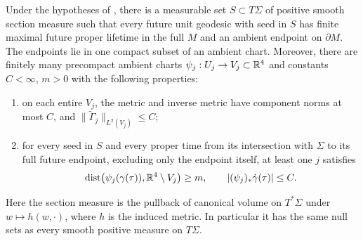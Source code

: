 \begin{proposition}
\label{prop:exit-family}
Under the hypotheses of , there is a measurable
set $S\subset T\Sigma$ of positive smooth section measure such
that every future unit geodesic with seed in $S$ has finite
maximal future proper lifetime in the full $M$ and an ambient
endpoint on $\partial M$.  The endpoints lie in one compact
subset of an ambient chart.  Moreover, there are finitely many
precompact ambient charts $\psi_j:U_j\to V_j\subset\mathbb R^4$ and
constants $C<\infty$, $m>0$ with the following properties:
\begin{enumerate}[label=(\roman*)]
\item on each entire $V_j$, the metric and inverse metric have
      component norms at most $C$, and
      $\|\widetilde\Gamma_j\|_{L^2(V_j)}\le C$;
\item for every seed in $S$ and every proper time from its
      intersection with $\Sigma$ to its full future endpoint,
      excluding only the endpoint itself, at least one $j$
      satisfies
      \begin{equation}\label{ex:chart-witness}
      \operatorname{dist}\bigl(\psi_j(\gamma(\tau)),
                                  \mathbb R^4\setminus V_j\bigr)\ge m,
      \qquad
      |(\psi_j)_*\dot\gamma(\tau)|\le C.
      \end{equation}
\end{enumerate}
Here the section measure is the pullback of canonical volume
on $T^*\Sigma$ under $w\mapsto h(w,\cdot)$, where $h$ is the
induced metric.  In particular it has the same null sets as
every smooth positive measure on $T\Sigma$.
\end{proposition}


